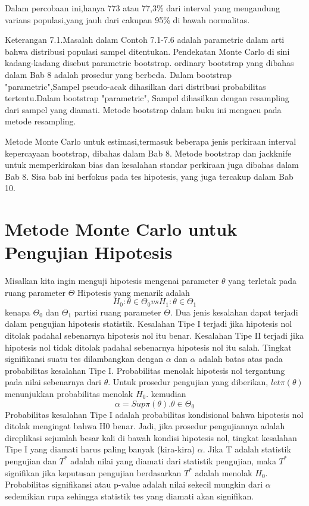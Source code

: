 \documentclass[a4paper,12pt]{article}
\theoremstyle{definition}
\begin{document}
Dalam percobaan ini,hanya 773 atau 77,3\% dari interval yang mengandung varians populasi,yang jauh dari cakupan 95\% di bawah normalitas.

Keterangan 7.1.Masalah dalam Contoh 7.1-7.6 adalah parametric dalam arti bahwa distribusi populasi sampel ditentukan. Pendekatan Monte Carlo di sini kadang-kadang disebut parametric bootstrap. ordinary bootstrap yang dibahas dalam Bab 8 adalah prosedur yang berbeda. Dalam bootstrap "parametric",Sampel pseudo-acak dihasilkan dari distribusi probabilitas tertentu.Dalam bootstrap "parametric", Sampel dihasilkan dengan resampling dari sampel yang diamati. Metode bootstrap dalam buku ini mengacu pada metode resampling.

Metode Monte Carlo untuk estimasi,termasuk beberapa jenis perkiraan interval kepercayaan bootstrap, dibahas dalam Bab 8. Metode bootstrap dan jackknife untuk memperkirakan bias dan kesalahan standar perkiraan juga dibahas dalam Bab 8. Sisa bab ini berfokus pada tes hipotesis, yang juga tercakup dalam Bab 10.

\section{Metode Monte Carlo untuk Pengujian Hipotesis}
Misalkan kita ingin menguji hipotesis mengenai parameter $\theta$ yang terletak pada ruang parameter $\Theta$  Hipotesis yang menarik adalah
\begin{equation*}
    H_{0} : \theta \in  \Theta _{0} vs H_{1} : \theta \in \Theta _{1}
\end{equation*}
kenapa $\Theta _{0}$ dan $\Theta _{1}$ partisi ruang parameter $\Theta$.
Dua jenis kesalahan dapat terjadi dalam pengujian hipotesis statistik. Kesalahan Tipe I terjadi jika hipotesis nol ditolak padahal sebenarnya hipotesis nol itu benar. Kesalahan Tipe II terjadi jika hipotesis nol tidak ditolak padahal sebenarnya hipotesis nol itu salah.
Tingkat signifikansi suatu tes dilambangkan dengan $\alpha$ dan $\alpha$ adalah batas atas pada probabilitas kesalahan Tipe I. Probabilitas menolak hipotesis nol tergantung pada nilai sebenarnya dari $\theta$. Untuk prosedur pengujian yang diberikan, $let \pi \left (\theta  \right )$ menunjukkan probabilitas menolak $H_{0}$. kemudian
\begin{equation*}
    \alpha  = Sup \pi \left ( \theta  \right ).
              \theta \in \Theta _{0}
\end{equation*}
Probabilitas kesalahan Tipe I adalah probabilitas kondisional bahwa hipotesis nol ditolak mengingat bahwa H0 benar. Jadi, jika prosedur pengujiannya adalah direplikasi sejumlah besar kali di bawah kondisi hipotesis nol, tingkat kesalahan Tipe I yang diamati harus paling banyak (kira-kira) $\alpha$.
Jika T adalah statistik pengujian dan $T^{*}$ adalah nilai yang diamati dari statistik pengujian, maka $T^{*}$ signifikan jika keputusan pengujian berdasarkan $T^{*}$ adalah menolak $H_{0}$. Probabilitas signifikansi atau p-value adalah nilai sekecil mungkin dari $\alpha$ sedemikian rupa sehingga statistik tes yang diamati akan signifikan.
\end{document}
